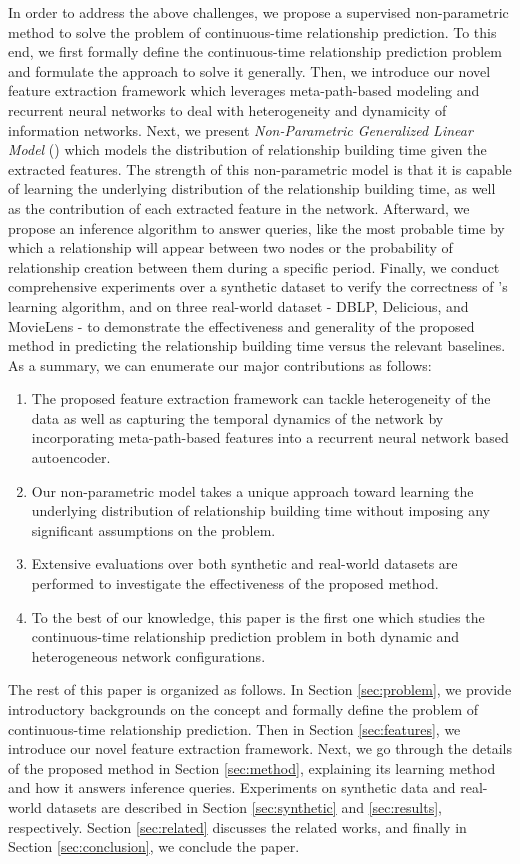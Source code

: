 In order to address the above challenges, we propose a supervised non-parametric method to solve the problem of continuous-time relationship prediction. To this end, we first formally define the continuous-time relationship prediction problem and formulate the approach to solve it generally. Then, we introduce our novel feature extraction framework which leverages meta-path-based modeling and recurrent neural networks to deal with heterogeneity and dynamicity of information networks. Next, we present \emph{Non-Parametric Generalized Linear Model} (\npglm) which models the distribution of relationship building time given the extracted features. The strength of this non-parametric model is that it is capable of learning the underlying distribution of the relationship building time, as well as the contribution of each extracted feature in the network. Afterward, we propose an inference algorithm to answer queries, like the most probable time by which a relationship will appear between two nodes or the probability of relationship creation between them during a specific period. Finally, we conduct comprehensive experiments over a synthetic dataset to verify the correctness of \npglm's learning algorithm, and on three real-world dataset - DBLP, Delicious, and MovieLens - to demonstrate the effectiveness and generality of the proposed method in predicting the relationship building time versus the relevant baselines. As a summary, we can enumerate our major contributions as follows:

\begin{enumerate}[label=(\roman*)]
\item The proposed feature extraction framework can tackle heterogeneity of the data as well as capturing the temporal dynamics of the network by incorporating meta-path-based features into a recurrent neural network based autoencoder.
\item Our non-parametric model takes a unique approach toward learning the underlying distribution of relationship building time without imposing any significant assumptions on the problem.
\item Extensive evaluations over both synthetic and real-world datasets are performed to investigate the effectiveness of the proposed method. 
\item To the best of our knowledge, this paper is the first one which studies the continuous-time relationship prediction problem in both dynamic and heterogeneous network configurations.
\end{enumerate}

The rest of this paper is organized as follows. In Section \ref{sec:problem}, we provide introductory backgrounds on the concept and formally define the problem of continuous-time relationship prediction. Then in Section \ref{sec:features}, we introduce our novel feature extraction framework. Next, we go through the details of the proposed \npglm method in Section \ref{sec:method}, explaining its learning method and how it answers inference queries. Experiments on synthetic data and real-world datasets are described in Section \ref{sec:synthetic} and \ref{sec:results}, respectively. Section \ref{sec:related} discusses the related works, and finally in Section \ref{sec:conclusion}, we conclude the paper.
